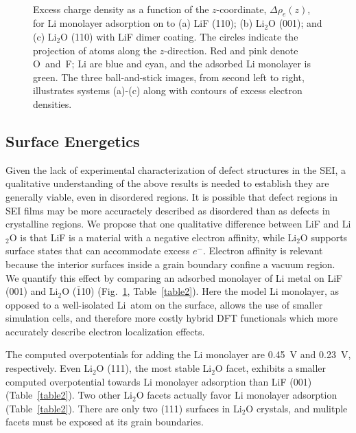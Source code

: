 \documentclass[prb,preprint,amsmath,amssymb]{revtex4}
\begin{document}
\begin{figure}
\centerline{\hbox{  \epsfxsize=1.20in 
                   \hspace*{0.05in} \epsfxsize=0.78in 
                    \epsfxsize=0.9in 
                    \epsfxsize=0.84in  }}
\caption[]
{\label{fig2} \noindent
Excess charge density as a function of the $z$-coordinate, $\Delta \rho_e(z)$,
for Li monolayer adsorption on to (a) LiF (110); (b) Li$_2$O (001);
and (c) Li$_2$O (110) with LiF dimer coating.  The circles indicate the
projection of atoms along the $z$-direction.  Red and pink denote O~and~F;
Li are blue and cyan, and the adsorbed Li monolayer is green.  The three
ball-and-stick images, from second left to right, illustrates systems
(a)-(c) along with contours of excess electron densities.
}
\end{figure}

\subsection*{Surface Energetics}

Given the lack of experimental characterization of defect structures
in the SEI, a qualitative understanding of the above results is needed
to establish they are generally viable, even in disordered regions.
It is possible that defect regions in SEI films may be more accuractely
described as disordered than as defects in crystalline regions.  We propose
that one qualitative difference between LiF and Li$_2$O is that LiF is
a material with a negative electron affinity,\cite{shluger} while Li$_2$O
supports surface states that can accommodate excess $e^-$.  Electron affinity
is relevant because the interior surfaces inside a grain boundary confine a
vacuum region.  We quantify this effect by comparing an adsorbed monolayer
of Li metal on LiF (001) and Li$_2$O ($\bar{1}$10) (Fig.~\ref{fig2},
Table~\ref{table2}).  Here the model Li monolayer, as opposed
to a well-isolated Li~atom on the surface, allows the use of smaller 
simulation cells, and therefore more costly hybrid DFT functionals which more
accurately describe electron localization effects. 

The computed overpotentials for adding the Li monolayer are 0.45~V and 0.23~V,
respectively.  Even Li$_2$O (111), the most stable Li$_2$O facet, exhibits a
smaller computed overpotential towards Li monolayer adsorption than LiF (001)
(Table~\ref{table2}).  Two other Li$_2$O facets actually favor Li monolayer
adsorption (Table~\ref{table2}).  There are only two (111) surfaces in Li$_2$O
crystals, and mulitple facets must be exposed at its grain boundaries.
\end{document}
